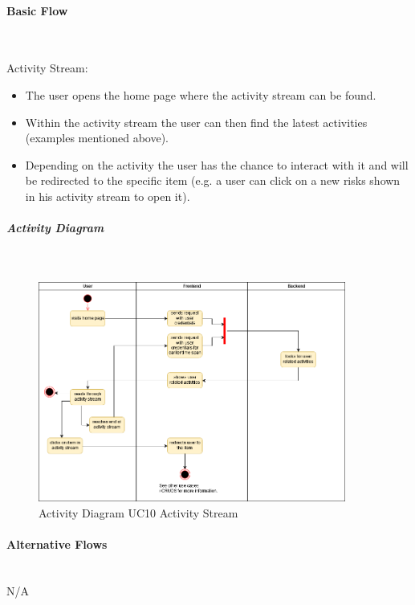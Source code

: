 \paragraph*{Basic Flow} \mbox{}\\


\noindent
Activity Stream: 
\begin{itemize}
	\vspace{-3mm}
	\setlength\itemsep{-1em}
	\item The user opens the home page where the activity stream can be found.
	\item Within the activity stream the user can then find the latest activities (examples mentioned above).
	\item Depending on the activity the user has the chance to interact with it and will be redirected to the specific item (e.g. a user can click on a new risks shown in his activity stream to open it).
\end{itemize} 


\newpage
\subparagraph{Activity Diagram}\mbox{}\\
\begin{figure}[h]
	\centering
	\includegraphics[width=0.9\textwidth]{Content/Domain/UC10ActivityStream.png}
	\caption{Activity Diagram \ac{UC}10 Activity Stream}
	\label{fig:label11}
\end{figure}

\paragraph*{Alternative Flows}\mbox{}\\
N/A

